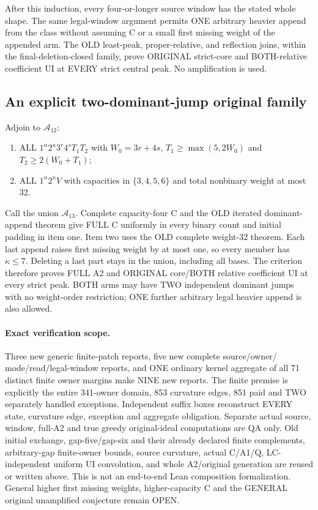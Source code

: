 After this induction, every four-or-longer source window has the
stated whole shape. The same legal-window argument permits ONE
arbitrary heavier append from the class without assuming C or a
small first missing weight of the appended arm. The OLD least-peak,
proper-relative, and reflection joins, within the final-deletion-closed
family, prove ORIGINAL strict-core and BOTH-relative coefficient UI
at EVERY strict central peak. No amplification is used.

\subsection{An explicit two-dominant-jump original family}
Adjoin to $\mathcal A_{12}$:
\begin{enumerate}
\item ALL $1^\alpha2^u3^r4^sT_1T_2$ with $W_0=3r+4s$,
      $T_1\ge\max(5,2W_0)$ and $T_2\ge2(W_0+T_1)$;
\item ALL $1^\alpha2^uV$ with capacities in $\{3,4,5,6\}$
      and total nonbinary weight at most 32.
\end{enumerate}
Call the union $\mathcal A_{13}$. Complete capacity-four C and
the OLD iterated dominant-append theorem give FULL C uniformly
in every binary count and initial padding in item one. Item two
uses the OLD complete weight-32 theorem. Each last append raises
first missing weight by at most one, so every member has $\kappa\le7$.
Deleting a last part stays in the union, including all bases.
The criterion therefore proves FULL A2 and ORIGINAL core/BOTH
relative coefficient UI at every strict peak. BOTH arms may have
TWO independent dominant jumps with no weight-order restriction;
ONE further arbitrary legal heavier append is also allowed.

\paragraph{Exact verification scope.}
Three new generic finite-patch reports, five new complete source/owner/
mode/read/legal-window reports, and ONE ordinary kernel aggregate of
all 71 distinct finite owner margins make NINE new reports.
The finite premise is explicitly the entire 341-owner domain,
853 curvature edges, 851 paid and TWO separately handled exceptions.
Independent suffix boxes reconstruct EVERY state, curvature edge,
exception and aggregate obligation. Separate actual source, window,
full-A2 and true greedy original-ideal computations are QA only.
Old initial exchange, gap-five/gap-six and their already declared
finite complements, arbitrary-gap finite-owner bounds, source
curvature, actual C/A1/Q, LC-independent uniform UI convolution,
and whole A2/original generation are reused or written above.
This is not an end-to-end Lean composition formalization.
General higher first missing weights, higher-capacity C and the
GENERAL original unamplified conjecture remain OPEN.
